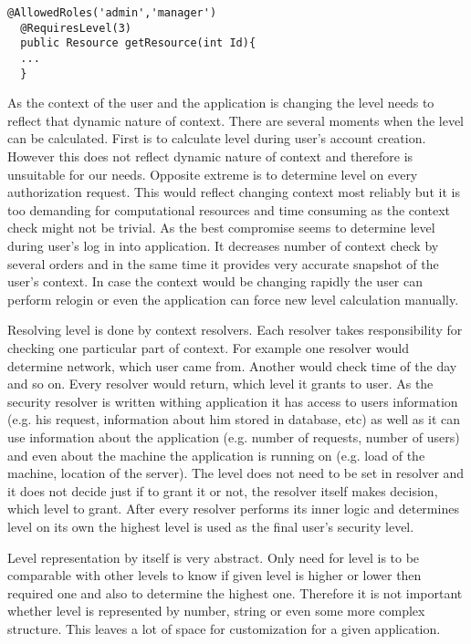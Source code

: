 \documentclass{poster15}
\begin{document}
\begin{lstlisting}[frame=single]
  @AllowedRoles('admin','manager')
  @RequiresLevel(3)
  public Resource getResource(int Id){
  ...
  }
\end{lstlisting}


As the context of the user and the application is changing the level needs to reflect that dynamic nature of context. There are several moments when the level can be calculated. First is to calculate level during user's account creation. However this does not reflect dynamic nature of context and therefore is unsuitable for our needs. Opposite extreme is to determine level on every authorization request. This would reflect changing context most reliably but it is too demanding for computational resources and time consuming as the context check might not be trivial. As the best compromise seems to determine level during user's log in into application. It decreases number of context check by several orders and in the same time it provides very accurate snapshot of the user's context. In case the context would be changing rapidly the user can perform relogin or even the application can force new level calculation manually.

Resolving level is done by context resolvers. Each resolver takes responsibility for checking one particular part of context. For example one resolver would determine network, which user came from. Another would check time of the day and so on. Every resolver would return, which level it grants to user. As the security resolver is written withing application it has access to users information (e.g. his request, information about him stored in database, etc) as well as it can use information about the application (e.g. number of requests, number of users) and even about the machine the application is running on (e.g. load of the machine, location of the server). The level does not need to be set in resolver and it does not decide just if to grant it or not, the resolver itself makes decision, which level to grant. After every resolver performs its inner logic and determines level on its own the highest level is used as the final user's security level.

Level representation by itself is very abstract. Only need for level is to be comparable with other levels to know if given level is higher or lower then required one and also to determine the highest one. Therefore it is not important whether level is represented by number, string or even some more complex structure. This leaves a lot of space for customization for a given application.
\end{document}
